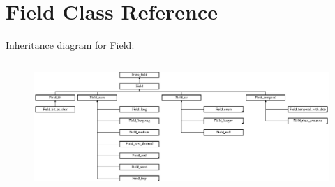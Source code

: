 \hypertarget{classField}{}\section{Field Class Reference}
\label{classField}
Inheritance diagram for Field\+:\begin{figure}[H]
\begin{center}
\leavevmode
\includegraphics[height=4.907976cm]{classField}
\end{center}
\end{figure}
